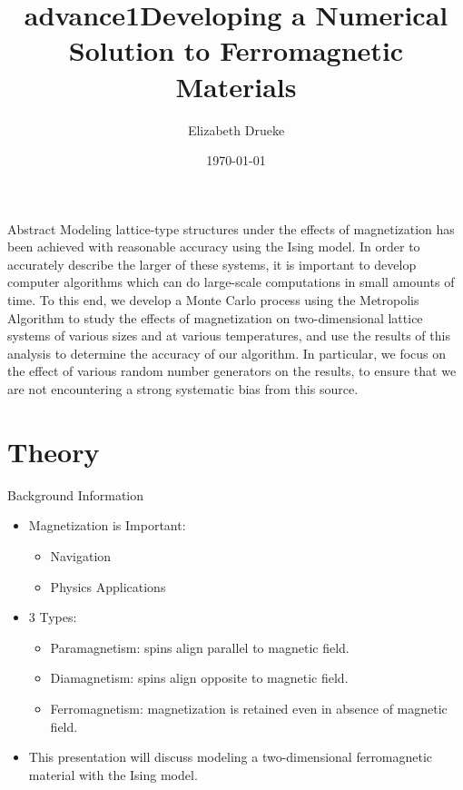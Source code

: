 \documentclass{beamer} %
\title{advance1}
\title[PHY 480 Final Presentation]{Developing a Numerical Solution to Ferromagnetic Materials}
\author[E.Drueke]{Elizabeth Drueke}
\date{\today}
\begin{document}
\begin{frame}
\titlepage
\end{frame}

\begin{frame}{Abstract}
Modeling lattice-type structures under the effects of magnetization has been achieved with reasonable accuracy using the Ising model.  In order to accurately describe the larger of these systems, it is important to develop computer algorithms which can do large-scale computations in small amounts of time.  To this end, we develop a Monte Carlo process using the Metropolis Algorithm to study the effects of magnetization on two-dimensional lattice systems of various sizes and at various temperatures, and use the results of this analysis to determine the accuracy of our algorithm.  In particular, we focus on the effect of various random number generators on the results, to ensure that we are not encountering a strong systematic bias from this source.
\end{frame}

\section{Theory}

\begin{frame}{Background Information}
\begin{itemize}
\item Magnetization is Important:
\begin{itemize}
\item Navigation
\item Physics Applications
\end{itemize}
\item 3 Types:
\begin{itemize}
\item Paramagnetism: spins align parallel to magnetic field.
\item Diamagnetism: spins align opposite to magnetic field.
\item Ferromagnetism: magnetization is retained even in absence of magnetic field.
\end{itemize}
\item This presentation will discuss modeling a two-dimensional ferromagnetic material with the Ising model.
\end{itemize}
\end{frame}
\end{document}
